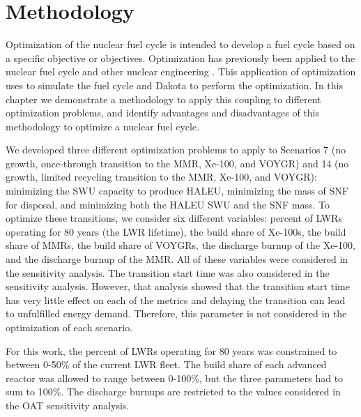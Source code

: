 \section{Methodology}
Optimization of the nuclear fuel cycle is intended to develop 
a fuel cycle based on a specific objective or objectives. 
Optimization has previously been applied to the nuclear fuel 
cycle \cite{passerini_sensitivity_2012,andrianov_optimization_2019}
and other nuclear engineering \cite{chee_fluoride-salt-cooled_2022}.
This application of optimization uses \Cyclus \cite{huff_fundamental_2016}
to simulate the fuel cycle and Dakota \cite{adams_dakota_2019} to 
perform the optimization. In this chapter we demonstrate a methodology to 
apply this coupling to different optimization problems, and identify 
advantages and disadvantages of this methodology to optimize a nuclear 
fuel cycle. 

We developed three different optimization problems to apply to 
Scenarios 7 (no growth, once-through transition to the \gls{MMR}, Xe-100, 
and VOYGR) and 14 (no growth, limited recycling transition to the 
\gls{MMR}, Xe-100, and VOYGR): minimizing the \gls{SWU} capacity to 
produce \gls{HALEU}, minimizing the mass of \gls{SNF} for disposal, 
and minimizing both the \gls{HALEU} \gls{SWU} and the \gls{SNF} 
mass. To optimize these transitions, we consider six different 
variables: percent of \glspl{LWR} operating for 80 years (the \gls{LWR} 
lifetime), the build share 
of Xe-100s, the build share of \glspl{MMR}, the build share of VOYGRs, 
the discharge burnup of the Xe-100, and the discharge burnup of the 
\gls{MMR}. All of these variables were considered in the sensitivity 
analysis. The transition start time was also considered in the sensitivity 
analysis. However, that analysis showed that the transition start time has
very little effect on each of the metrics and delaying the transition 
can lead to unfulfilled energy demand. Therefore, this parameter is 
not considered in the optimization of each scenario. 

For this work, the percent of \glspl{LWR} operating for 80 years 
was constrained to between 0-50\% of the current \gls{LWR} fleet. 
The build share of each advanced reactor was allowed to range between 
0-100\%, but the three parameters had to sum to 100\%. The discharge 
burnups are restricted to the values considered in the \gls{OAT} 
sensitivity analysis.

